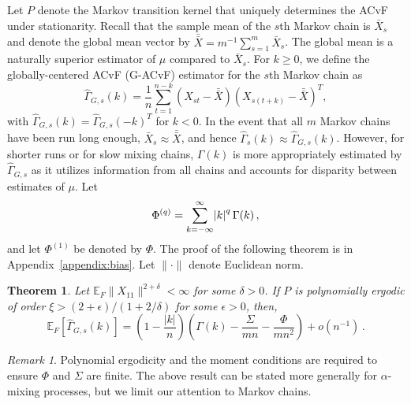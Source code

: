 \documentclass[11pt]{article}
\newcommand{\E}{\mathbb{E}}
\newtheorem{theorem}{Theorem}
\theoremstyle{remark}
\newtheorem{remark}{Remark}
\begin{document}
Let $P$ denote the Markov transition kernel that uniquely determines the ACvF under stationarity. Recall that the sample mean of the $s${th} Markov chain is $\bar{X}_s$ and denote the global mean vector by $\bar{\bar{X}} = m^{-1}\sum_{s = 1}^{m}\bar{X}_s$. The global mean is a naturally superior estimator of $\mu$ compared to $\bar{X}_s$. For $k \geq 0$, we define the globally-centered ACvF (G-ACvF) estimator for the $s${th} Markov chain as
%
\begin{equation} \label{eq:G-ACvF}
    \hat{\Gamma}_{G,s}(k) = \dfrac{1}{n} \sum_{t=1}^{n-k}(X_{st}-\bar{\bar{X}})(X_{s(t+k)}-\bar{\bar{X}})^T,
\end{equation}
with $\hat{\Gamma}_{G,s}(k) = \hat{\Gamma}_{G,s}(-k)^T$ for $k < 0$. In the event that all $m$ Markov chains have been run long enough, $\bar{X}_s \approx \bar{\bar{X}}$, and hence  $\hat{\Gamma}_{s} (k) \approx \hat{\Gamma}_{G,s}(k)$. However, for shorter runs or for slow mixing chains, $\Gamma(k)$ is more appropriately estimated by $\hat{\Gamma}_{G,s}$ as it utilizes information from all chains and accounts for disparity between estimates of $\mu$. 
Let 
\begin{equation*}
\Phi^{(q)} = \sum_{ k= -\infty}^{\infty}\abs{k}^q \Gamma(k)\,,  
\end{equation*}
%
and let $\Phi^{(1)}$ be denoted by $\Phi$.  The proof of the following theorem is in Appendix~\ref{appendix:bias}. Let $\|\cdot\|$ denote Euclidean norm. 


\begin{theorem} \label{th:G-ACF_bias} Let $\E_F \|X_{11}\|^{2 + \delta} < \infty$ for some $\delta > 0$. If $P$ is polynomially ergodic of order $\xi > (2 + \epsilon)/(1 + 2/\delta)$ for some $\epsilon > 0$,  then,
\[
   \mathbb{E}_F\left[\hat{\Gamma}_{G,s}(k) \right] = \left(1- \dfrac{|k|}{n}\right) \left(\Gamma(k) - \dfrac{\Sigma}{mn} - \dfrac{\Phi}{mn^2}\right)  + o \left(n^{-1} \right)\,.
\]
\end{theorem}

\begin{remark}
Polynomial ergodicity and the moment conditions are required to ensure $\Phi$ and $\Sigma$ are finite. The above result can be stated more generally for $\alpha$-mixing processes, but we limit our attention to Markov chains. 
\end{remark}
\end{document}
